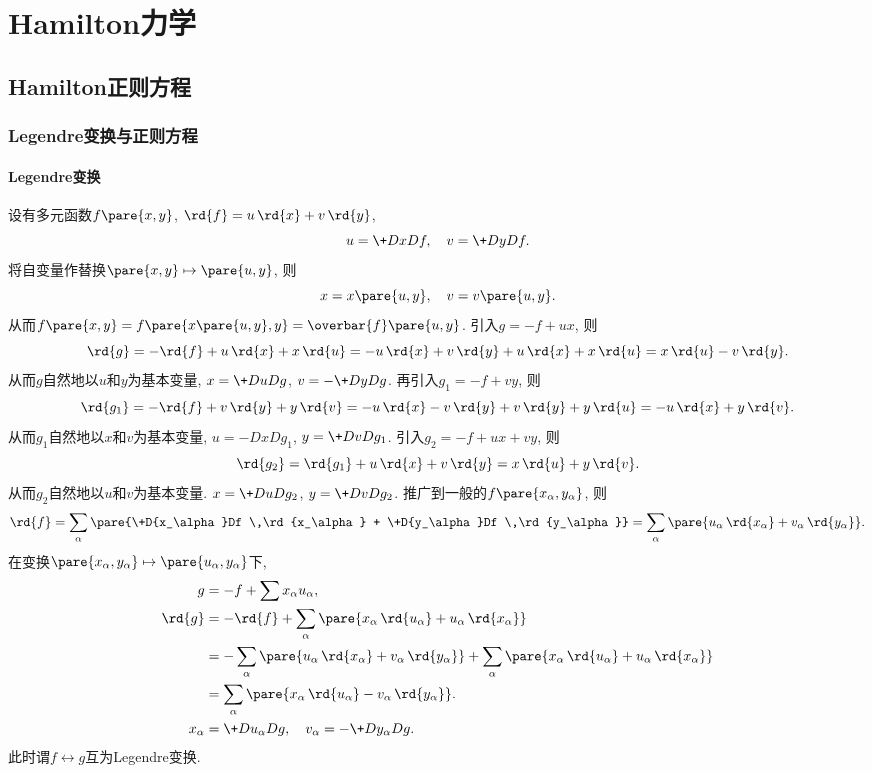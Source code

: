 \documentclass{ctexart}
\begin{document}
\section{Hamilton力学} %
\label{sec:hamilton力学}

\subsection{Hamilton正则方程} %
\label{sub:hamilton正则方程}

\subsubsection{Legendre变换与正则方程} %
\label{ssub:legendre变换与正则方程}

\paragraph{Legendre变换} %
\label{par:legendre变换}

设有多元函数$f\pare{x,y}$, $\rd{f} = u\,\rd{x} + v\,\rd{y}$,
\[ u = \+DxDf, \quad v = \+DyDf. \]
将自变量作替换$\pare{x,y}\mapsto \pare{u,y}$, 则
\[ x = x\pare{u,y},\quad v = v\pare{u,y}. \]
从而$f\pare{x,y} = f\pare{x\pare{u,y},y} = \overbar{f}\pare{u,y}$. 引入$g = -f+ux$, 则
\[ \rd{g} = -\rd{f} + u\,\rd{x} + x\,\rd{u} = -u\,\rd{x} + v\,\rd{y} + u\,\rd{x} + x\,\rd{u} = x\,\rd{u} - v\,\rd{y}. \]
从而$g$自然地以$u$和$y$为基本变量, $\displaystyle x = \+DuDg$, $\displaystyle v = -\+DyDg$. 再引入$g_1 = -f+vy$, 则
\[ \rd{g_1} = -\rd{f} + v\,\rd{y} + y\,\rd{v} = -u\,\rd{x} - v\,\rd{y} + v\,\rd{y} + y\,\rd{u} = -u\,\rd{x} + y\,\rd{v} .\]
从而$g_1$自然地以$x$和$v$为基本变量, $\displaystyle u = -DxD{g_1}$, $\displaystyle y = \+DvD{g_1}$. 引入$g_2 = -f+ux+vy$, 则
\[ \rd{g_2} = \rd{g_1} + u\,\rd{x} + v\,\rd{y} = x\,\rd{u} + y\,\rd{v}. \]
从而$g_2$自然地以$u$和$v$为基本变量. $\displaystyle x = \+DuD{g_2}$, $\displaystyle y = \+DvD{g_2}$. 推广到一般的$f\pare{x_\alpha,y_\alpha}$, 则
\[ \rd{f} = \sum_\alpha \pare{\+D{x_\alpha}Df \,\rd{x_\alpha} + \+D{y_\alpha}Df \,\rd{y_\alpha}} = \sum_\alpha \pare{u_\alpha\,\rd{x_\alpha} + v_\alpha\,\rd{y_\alpha}}. \]
在变换$\pare{x_\alpha,y_\alpha}\mapsto \pare{u_\alpha,y_\alpha}$下,
\begin{align*}
    g &= -f + \sum x_\alpha u_\alpha, \\
    \rd{g} &= -\rd{f} + \sum_\alpha \pare{x_\alpha \,\rd{u_\alpha} + u_\alpha\,\rd{x_\alpha}} \\
    &= -\sum_\alpha \pare{u_\alpha\,\rd{x_\alpha} + v_\alpha \,\rd{y_\alpha}} + \sum_\alpha \pare{x_\alpha\,\rd{u_\alpha} + u_\alpha\,\rd{x_\alpha}} \\
    &= \sum_\alpha \pare{x_\alpha\,\rd{u_\alpha} - v_\alpha\,\rd{y_\alpha}}. \\
    x_\alpha &= \+D{u_\alpha}Dg,\quad v_\alpha = -\+D{y_\alpha}Dg.
\end{align*}
此时谓$f\leftrightarrow g$互为Legendre变换.
\end{document}
